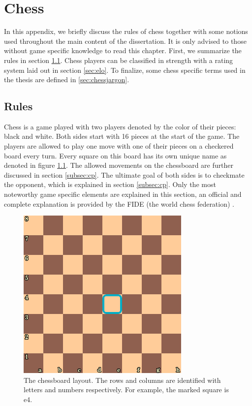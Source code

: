 \chapter{Chess}
\label{ch:chess_app}
In this appendix, we briefly discuss the rules of chess together with some notions used throughout the main content of the dissertation. It is only advised to those without game specific knowledge to read this chapter. First, we summarize the rules in section \ref{sec:rules}. Chess players can be classified in strength with a rating system laid out in section \ref{sec:elo}. To finalize, some chess specific terms used in the thesis are defined in \ref{sec:chessjargon}.

\section{Rules}
\label{sec:rules}
Chess is a game played with two players denoted by the color of their pieces: black and white. Both sides start with 16 pieces at the start of the game. The players are allowed to play one move with one of their pieces on a checkered board every turn. Every square on this board has its own unique name as denoted in figure \ref{fig:empty}. The allowed movements on the chessboard are further discussed in section \ref{subsec:cp}. The ultimate goal of both sides is to checkmate the opponent, which is explained in section \ref{subsec:cp}. Only the most noteworthy game specific elements are explained in this section, an official and complete explanation is provided by the FIDE (the world chess federation) \cite{ruleschess}.

\begin{figure}
\centering
\includegraphics[scale=0.5]{fig/rules/empty}
\caption[Chessboard layout]{The chessboard layout. The rows and columns are identified with letters and numbers respectively. For example, the marked square is e4.}
\label{fig:empty}
\end{figure}

